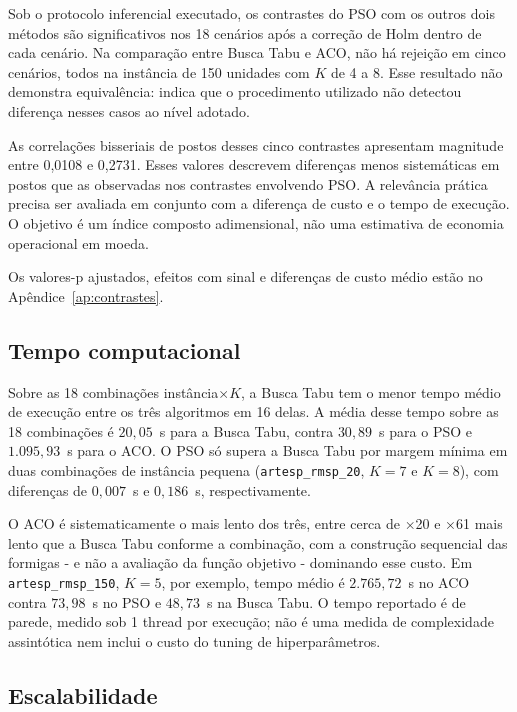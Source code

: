 \documentclass[12pt,a4paper]{article}
\begin{document}
Sob o protocolo inferencial executado, os contrastes do PSO com os outros dois métodos
são significativos nos 18 cenários após a correção de Holm dentro de cada cenário. Na
comparação entre Busca Tabu e ACO, não há rejeição em cinco cenários, todos na instância
de 150 unidades com $K$ de 4 a 8. Esse resultado não demonstra equivalência: indica que
o procedimento utilizado não detectou diferença nesses casos ao nível adotado.

As correlações bisseriais de postos desses cinco contrastes apresentam magnitude entre
0,0108 e 0,2731. Esses valores descrevem diferenças menos sistemáticas em postos que as
observadas nos contrastes envolvendo PSO. A relevância prática precisa ser avaliada em
conjunto com a diferença de custo e o tempo de execução. O objetivo é um índice composto
adimensional, não uma estimativa de economia operacional em moeda.

Os valores-p ajustados, efeitos com sinal e diferenças de custo médio estão no Apêndice~\ref{ap:contrastes}.

\subsection{Tempo computacional}
\label{subsec:tempo-resultados}

Sobre as 18 combinações instância$\times K$, a Busca Tabu tem o menor tempo
médio de execução entre os três algoritmos em 16
delas. A média desse tempo sobre as 18 combinações é
$20{,}05$~s para a Busca Tabu, contra $30{,}89$~s para o PSO e
$1.095{,}93$~s para o ACO. O PSO só supera a Busca Tabu por margem mínima em
duas combinações de instância pequena (\texttt{artesp\_rmsp\_20}, $K=7$ e
$K=8$), com diferenças de $0{,}007$~s e $0{,}186$~s, respectivamente.

O ACO é sistematicamente o mais lento dos três, entre cerca de ×20 e ×61
mais lento que a Busca Tabu conforme a combinação, com a construção
sequencial das formigas - e não a avaliação da função objetivo - dominando
esse custo. Em \texttt{artesp\_rmsp\_150}, $K=5$, por exemplo,
tempo médio é $2.765{,}72$~s no ACO contra $73{,}98$~s no PSO e
$48{,}73$~s na Busca Tabu. O tempo reportado é de parede, medido sob 1
thread por execução; não é uma medida de complexidade assintótica nem inclui
o custo do tuning de hiperparâmetros.

\subsection{Escalabilidade}
\label{subsec:escala}
\end{document}
